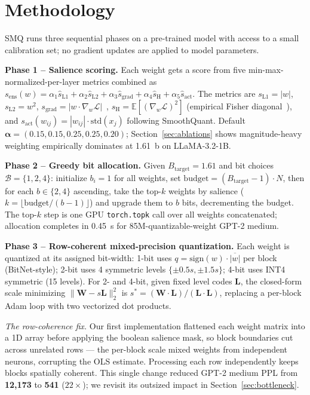 \documentclass[11pt]{article}
\begin{document}
\section{Methodology}
\label{sec:method}

SMQ runs three sequential phases on a pre-trained model with access to a small calibration
set; no gradient updates are applied to model parameters.

\textbf{Phase 1 -- Salience scoring.}
Each weight gets a score from five min-max-normalized-per-layer metrics combined as
$s_{\text{ens}}(w) = \alpha_1 \hat{s}_{\text{L1}} + \alpha_2 \hat{s}_{\text{L2}}
+ \alpha_3 \hat{s}_{\text{grad}} + \alpha_4 \hat{s}_{\text{H}} + \alpha_5 \hat{s}_{\text{act}}$.
The metrics are
$s_{\text{L1}} = |w|$,
$s_{\text{L2}} = w^2$,
$s_{\text{grad}} = |w \cdot \nabla_w \mathcal{L}|$~\cite{lecun1990obd},
$s_{\text{H}} = \mathbb{E}[(\nabla_w \mathcal{L})^2]$ (empirical Fisher
diagonal~\cite{hassibi1993obs}),
and $s_{\text{act}}(w_{ij}) = |w_{ij}| \cdot \text{std}(x_j)$ following SmoothQuant.
Default $\boldsymbol{\alpha} = (0.15, 0.15, 0.25, 0.25, 0.20)$;
Section~\ref{sec:ablations} shows magnitude-heavy weighting empirically dominates at 1.61~b
on LLaMA-3.2-1B.

\textbf{Phase 2 -- Greedy bit allocation.}
Given $B_{\text{target}} = 1.61$ and bit choices $\mathcal{B} = \{1, 2, 4\}$:
initialize $b_i = 1$ for all weights, set $\text{budget} = (B_{\text{target}} - 1) \cdot N$,
then for each $b \in \{2, 4\}$ ascending, take the top-$k$ weights by salience
($k = \lfloor\text{budget}/(b{-}1)\rfloor$) and upgrade them to $b$ bits, decrementing the
budget.
The top-$k$ step is one GPU \texttt{torch.topk} call over all weights concatenated;
allocation completes in 0.45~s for 85M-quantizable-weight GPT-2 medium.

\textbf{Phase 3 -- Row-coherent mixed-precision quantization.}
Each weight is quantized at its assigned bit-width:
1-bit uses $q = \text{sign}(w) \cdot \overline{|w|}$ per block (BitNet-style);
2-bit uses 4 symmetric levels $\{\pm 0.5s, \pm 1.5s\}$;
4-bit uses INT4 symmetric (15 levels).
For 2- and 4-bit, given fixed level codes $\mathbf{L}$, the closed-form scale minimizing
$\|\mathbf{W} - s\mathbf{L}\|_2^2$ is $s^* = (\mathbf{W}\cdot\mathbf{L})/(\mathbf{L}\cdot\mathbf{L})$,
replacing a per-block Adam loop with two vectorized dot products.

\textit{The row-coherence fix.}
Our first implementation flattened each weight matrix into a 1D array before applying the
boolean salience mask, so block boundaries cut across unrelated rows --- the per-block scale
mixed weights from independent neurons, corrupting the OLS estimate.
Processing each row independently keeps blocks spatially coherent.
This single change reduced GPT-2 medium PPL from \textbf{12{,}173} to \textbf{541}
($22\times$); we revisit its outsized impact in Section~\ref{sec:bottleneck}.
\end{document}
